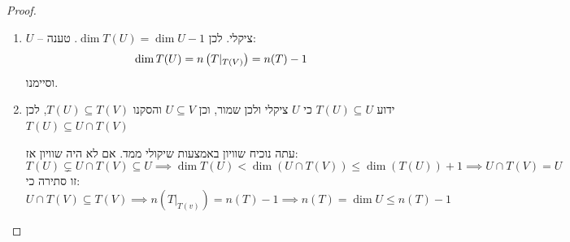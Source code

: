 \documentclass[name=רשימות אלגברה לינארית 2א]{../../../tex/classes/megasumPreamble}
\begin{document}
	
	\begin{proof}\,
		\begin{enumerate}
			\item $U$ – ציקלי. לכן $\dim T(U) = \dim U - 1$. 
			טענה: 
			\[ \dim T(U) = n\left ( T|_{{T(V)}} \right ) = n(T) - 1 \]
			וסיימנו. 
			\item ידוע $T(U) \subseteq U$ כי $U$ ציקלי ולכן שמור, וכן $U \subseteq V$ והסקנו $T(U) \subseteq T(V)$, לכן $T(U) \subseteq U \cap T(V)$
			
			עתה נוכיח שוויון באמצעות שיקולי ממד. אם לא היה שוויון אז: 
			\[ T(U) \subsetneq U \cap T(V) \subseteq U \implies \dim T(U) < \dim (U \cap T(V)) \le \dim (T(U)) + 1 \implies U \cap T(V) = U \]
			זו סתירה כי: 
			\[ U \cap T(V) \subseteq T(V) \implies n(T|_{{T(v)}}) = n(T) - 1 \implies n(T) = \dim U \le n(T) - 1 \]
			
		\end{enumerate}
	\end{proof}
	
\end{document}
